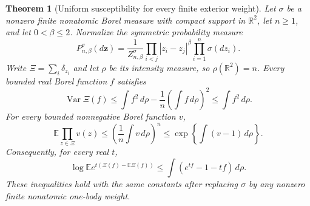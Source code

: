 \documentclass[11pt]{article}
\newtheorem{theorem}{Theorem}[section]
\theoremstyle{remark}\newtheorem{remark}[theorem]{Remark}
\begin{document}
\begin{theorem}[Uniform susceptibility for every finite exterior weight]
\label{thm:subpoisson-susceptibility}
Let $\sigma$ be a nonzero finite nonatomic Borel measure with compact
support in $\mathbb R^2$, let $n\ge1$, and let $0<\beta\le2$.
Normalize the symmetric probability measure
\[
 P_{n,\beta}^{\sigma}(d\mathbf z)
 =\frac{1}{Z_{n,\beta}^{\sigma}}
   \prod_{i<j}|z_i-z_j|^\beta\prod_{i=1}^n\sigma(dz_i).
\]
Write $\Xi=\sum_i\delta_{z_i}$ and let $\rho$ be its intensity measure,
so $\rho(\mathbb R^2)=n$.  Every bounded real Borel function $f$ satisfies
\begin{equation}
 \operatorname{Var}\Xi(f)
 \le \int f^2\,d\rho-\frac1n\left(\int f\,d\rho\right)^2
 \le \int f^2\,d\rho.
 \label{eq:subpoisson-variance}
\end{equation}
For every bounded nonnegative Borel function $v$,
\begin{equation}
 \mathbb E\prod_{z\in\Xi}v(z)
 \le\left(\frac1n\int v\,d\rho\right)^n
 \le\exp\!\left\{\int(v-1)\,d\rho\right\}.
 \label{eq:subpoisson-generating}
\end{equation}
Consequently, for every real $t$,
\begin{equation}
 \log\mathbb E e^{t(\Xi(f)-\mathbb E\Xi(f))}
 \le\int(e^{tf}-1-tf)\,d\rho.
 \label{eq:subpoisson-laplace}
\end{equation}
These inequalities hold with the same constants after replacing
$\sigma$ by any nonzero finite nonatomic one-body weight.
\end{theorem}
\end{document}
